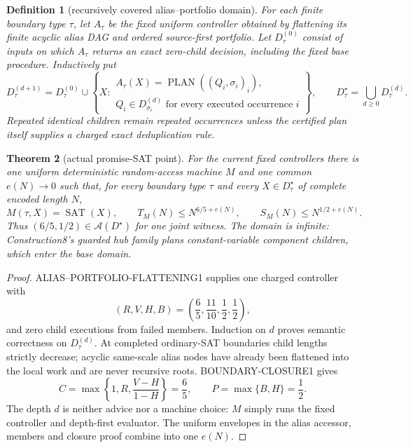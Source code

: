 \documentclass[11pt]{article}
\newtheorem{theorem}{Theorem}
\newtheorem{definition}[theorem]{Definition}
\newcommand{\SAT}{\operatorname{SAT}}
\newcommand{\A}{\mathcal A}
\begin{document}
\begin{definition}[recursively covered alias--portfolio domain]
For each finite boundary type $\tau$, let $A_\tau$ be the fixed uniform
controller obtained by flattening its finite acyclic alias DAG and ordered
source-first portfolio.  Let $D_\tau^{(0)}$ consist of inputs on which
$A_\tau$ returns an exact zero-child decision, including the fixed base
procedure.  Inductively put
\[
D_\tau^{(d+1)}=D_\tau^{(0)}\cup
 \left\{X:\begin{array}{l}
 A_\tau(X)=\operatorname{PLAN}((Q_i,\sigma_i)_i),\\[-2pt]
 Q_i\in D_{\sigma_i}^{(d)}\text{ for every executed occurrence }i
 \end{array}\right\},
\qquad D_\tau^\star=\bigcup_{d\ge0}D_\tau^{(d)}.
\]
Repeated identical children remain repeated occurrences unless the certified
plan itself supplies a charged exact deduplication rule.
\end{definition}

\begin{theorem}[actual promise-SAT point]\label{thm:promise}
For the current fixed controllers there is one uniform deterministic
random-access machine $M$ and one common $e(N)\to0$ such that, for every
boundary type $\tau$ and every $X\in D_\tau^\star$ of complete encoded length
$N$,
\[
 M(\tau,X)=\SAT(X),\qquad
 T_M(N)\le N^{6/5+e(N)},\qquad
 S_M(N)\le N^{1/2+e(N)}.                                \tag{1}
\]
Thus $(6/5,1/2)\in\A(D^\star)$ for one joint witness.  The domain is
infinite: Construction8's guarded hub family plans constant-variable
component children, which enter the base domain.
\end{theorem}
\begin{proof}
ALIAS--PORTFOLIO-FLATTENING1 supplies one charged controller with
\[
 (R,V,H,B)=\left(\frac65,\frac{11}{10},\frac12,\frac12\right),             \tag{2}
\]
and zero child executions from failed members.  Induction on $d$ proves
semantic correctness on $D_\tau^{(d)}$.  At completed ordinary-SAT
boundaries child lengths strictly decrease; acyclic same-scale alias nodes
have already been flattened into the local work and are never recursive
roots.  BOUNDARY-CLOSURE1 gives
\[
 C=\max\left\{1,R,\frac{V-H}{1-H}\right\}=\frac65,
 \qquad P=\max\{B,H\}=\frac12.                           \tag{3}
\]
The depth $d$ is neither advice nor a machine choice: $M$ simply runs the
fixed controller and depth-first evaluator.  The uniform envelopes in the
alias accessor, members and closure proof combine into one $e(N)$.
\end{proof}
\end{document}
